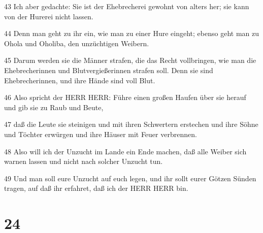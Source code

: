 \par 43 Ich aber gedachte: Sie ist der Ehebrecherei gewohnt von alters her; sie kann von der Hurerei nicht lassen.
\par 44 Denn man geht zu ihr ein, wie man zu einer Hure eingeht; ebenso geht man zu Ohola und Oholiba, den unzüchtigen Weibern.
\par 45 Darum werden sie die Männer strafen, die das Recht vollbringen, wie man die Ehebrecherinnen und Blutvergießerinnen strafen soll. Denn sie sind Ehebrecherinnen, und ihre Hände sind voll Blut.
\par 46 Also spricht der HERR HERR: Führe einen großen Haufen über sie herauf und gib sie zu Raub und Beute,
\par 47 daß die Leute sie steinigen und mit ihren Schwertern erstechen und ihre Söhne und Töchter erwürgen und ihre Häuser mit Feuer verbrennen.
\par 48 Also will ich der Unzucht im Lande ein Ende machen, daß alle Weiber sich warnen lassen und nicht nach solcher Unzucht tun.
\par 49 Und man soll eure Unzucht auf euch legen, und ihr sollt eurer Götzen Sünden tragen, auf daß ihr erfahret, daß ich der HERR HERR bin.

\chapter{24}

